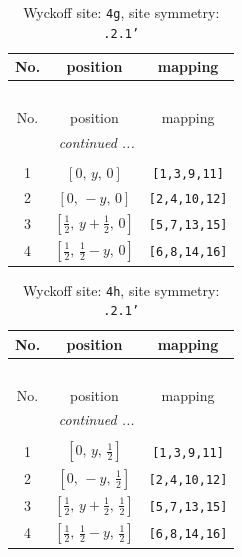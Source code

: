 \documentclass[fleqn,8pt]{jsarticle}
\begin{document}
\renewcommand{\arraystretch}{1.2}
\begin{longtable}{ccc}
\caption{Wyckoff site: {\tt 4g}, site symmetry: {\tt .2.1'}}
 \\
 \hline \hline
No. & position & mapping \\ \hline \endfirsthead

\multicolumn{2}{l}{\tablename\ \thetable{}} \\
 \hline \hline
No. & position & mapping \\ \hline \endhead

 \hline \hline
\multicolumn{2}{r}{\footnotesize\it continued ...} \\ \endfoot

 \hline \hline
\multicolumn{2}{r}{} \\ \endlastfoot

1 & $\left[ 0,\, y,\, 0 \right]$ & {\tt [1,3,9,11]} \\ \hline
2 & $\left[ 0,\, - y,\, 0 \right]$ & {\tt [2,4,10,12]} \\ \hline
3 & $\left[ \frac{1}{2},\, y + \frac{1}{2},\, 0 \right]$ & {\tt [5,7,13,15]} \\ \hline
4 & $\left[ \frac{1}{2},\, \frac{1}{2} - y,\, 0 \right]$ & {\tt [6,8,14,16]} \\
\end{longtable}
\renewcommand{\arraystretch}{1.2}
\begin{longtable}{ccc}
\caption{Wyckoff site: {\tt 4h}, site symmetry: {\tt .2.1'}}
 \\
 \hline \hline
No. & position & mapping \\ \hline \endfirsthead

\multicolumn{2}{l}{\tablename\ \thetable{}} \\
 \hline \hline
No. & position & mapping \\ \hline \endhead

 \hline \hline
\multicolumn{2}{r}{\footnotesize\it continued ...} \\ \endfoot

 \hline \hline
\multicolumn{2}{r}{} \\ \endlastfoot

1 & $\left[ 0,\, y,\, \frac{1}{2} \right]$ & {\tt [1,3,9,11]} \\ \hline
2 & $\left[ 0,\, - y,\, \frac{1}{2} \right]$ & {\tt [2,4,10,12]} \\ \hline
3 & $\left[ \frac{1}{2},\, y + \frac{1}{2},\, \frac{1}{2} \right]$ & {\tt [5,7,13,15]} \\ \hline
4 & $\left[ \frac{1}{2},\, \frac{1}{2} - y,\, \frac{1}{2} \right]$ & {\tt [6,8,14,16]} \\
\end{longtable}
\end{document}
